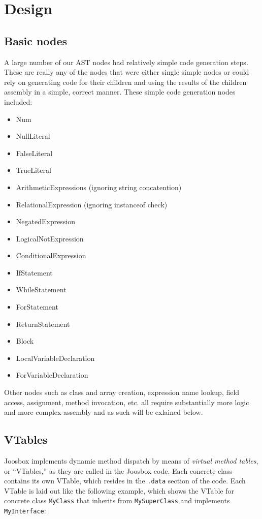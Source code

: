 \documentclass[letterpaper]{article}
\begin{document}
  \section{Design}

  \subsection{Basic nodes}

  A large number of our AST nodes had relatively simple code generation steps.
  These are really any of the nodes that were either single simple nodes or
  could rely on generating code for their children and using the results of the
  children assembly in a simple, correct manner. These simple code generation
  nodes included:

  \begin{itemize}
    \item Num
    \item NullLiteral
    \item FalseLiteral
    \item TrueLiteral
    \item ArithmeticExpressions (ignoring string concatention)
    \item RelationalExpression (ignoring instanceof check)
    \item NegatedExpression
    \item LogicalNotExpression
    \item ConditionalExpression
    \item IfStatement
    \item WhileStatement
    \item ForStatement
    \item ReturnStatement
    \item Block
    \item LocalVariableDeclaration
    \item ForVariableDeclaration
  \end{itemize}

  Other nodes such as class and array creation, expression name lookup,
  field access, assignment, method invocation, etc. all require substantially
  more logic and more complex assembly and as such will be exlained below.

  \subsection{VTables}

  Joosbox implements dynamic method dispatch by means of {\em virtual method
  tables}, or ``VTables,'' as they are called in the Joosbox code. Each
  concrete class contains its own VTable, which resides in the {\tt .data}
  section of the code. Each VTable is laid out like the following example,
  which shows the VTable for concrete class {\tt MyClass} that inherits from
  {\tt MySuperClass} and implements {\tt MyInterface}:
\end{document}
